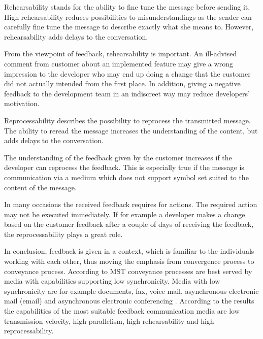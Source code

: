 \documentclass[conference]{IEEEtran}
\begin{document}
Rehearsability stands for the ability to fine tune the message before sending it. High rehearsability reduces possibilities to misunderstandings as the sender can carefully fine tune the message to describe exactly what she means to. However, rehearsability adds delays to the conversation. \cite{2008dennis} 

From the viewpoint of feedback, rehearsability is important. An ill-advised comment from customer about an implemented feature may give a wrong impression to the developer who may end up doing a change that the customer did not actually intended from the first place. In addition, giving a negative feedback to the development team in an indiscreet way may reduce developers' motivation.

Reprocessability describes the possibility to reprocess the transmitted message. The ability to reread the message increases the understanding of the content, but adds delays to the conversation. \cite{2008dennis}

The understanding of the feedback given by the customer increases if the developer can reprocess the feedback. This is especially true if the message is communication via a medium which does not support symbol set suited to the content of the message. 

In many occasions the received feedback requires for actions. The required action may not be executed immediately. If for example a developer makes a change based on the customer feedback after a couple of days of receiving the feedback, the reprocessability plays a great role.

In conclusion, feedback is given in a context, which is familiar to the individuals working with each other, thus moving the emphasis from convergence process to conveyance process. According to MST conveyance processes are best served by media with capabilities supporting low synchronicity. Media with low synchronicity are for example documents, fax, voice mail, asynchronous electronic mail (email) and asynchronous electronic conferencing \cite{2008dennis}. According to the results the capabilities of the most suitable feedback communication media are low transmission velocity, high parallelism, high rehearsability and high reprocessability.
\end{document}
